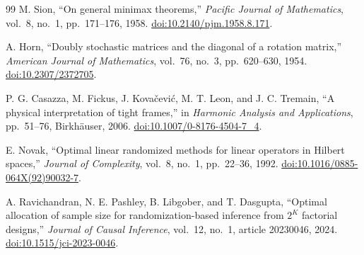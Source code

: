 \documentclass[11pt]{article}
\theoremstyle{definition}
\begin{document}
\begin{thebibliography}{99}
M. Sion,
``On general minimax theorems,''
\emph{Pacific Journal of Mathematics}, vol.~8, no.~1, pp.~171--176, 1958.
\href{https://doi.org/10.2140/pjm.1958.8.171}{doi:10.2140/pjm.1958.8.171}.

A. Horn,
``Doubly stochastic matrices and the diagonal of a rotation matrix,''
\emph{American Journal of Mathematics}, vol.~76, no.~3, pp.~620--630, 1954.
\href{https://doi.org/10.2307/2372705}{doi:10.2307/2372705}.

P. G. Casazza, M. Fickus, J. Kova\v{c}evi\'c, M. T. Leon, and J. C. Tremain,
``A physical interpretation of tight frames,'' in
\emph{Harmonic Analysis and Applications}, pp.~51--76, Birkh\"auser, 2006.
\href{https://doi.org/10.1007/0-8176-4504-7_4}{doi:10.1007/0-8176-4504-7\_4}.

E. Novak,
``Optimal linear randomized methods for linear operators in Hilbert spaces,''
\emph{Journal of Complexity}, vol.~8, no.~1, pp.~22--36, 1992.
\href{https://doi.org/10.1016/0885-064X(92)90032-7}{doi:10.1016/0885-064X(92)90032-7}.

A. Ravichandran, N. E. Pashley, B. Libgober, and T. Dasgupta,
``Optimal allocation of sample size for randomization-based inference from $2^K$ factorial
designs,''
\emph{Journal of Causal Inference}, vol.~12, no.~1, article 20230046, 2024.
\href{https://doi.org/10.1515/jci-2023-0046}{doi:10.1515/jci-2023-0046}.

\end{thebibliography}
\end{document}
